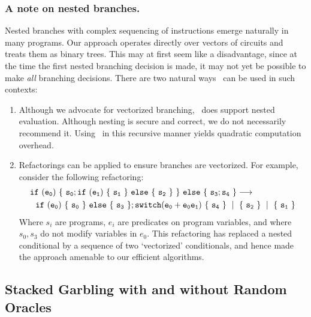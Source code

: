 \subsubsection{A note on nested branches.}
Nested branches with
complex sequencing of instructions emerge
naturally in many programs.
%
Our approach operates directly over vectors of circuits and treats
them as binary trees.
This may at first seem like a disadvantage, since at the
time the first nested branching decision is made, it may not yet be
possible to make \emph{all} branching decisions.
%
There are two natural ways \ourschemelong\ can be used in such
contexts:
%
\begin{enumerate}
  \item Although we advocate for vectorized branching,
    \ourschemelong\ does support nested evaluation.
    Although nesting is secure and correct, we do not necessarily
    recommend it. Using \ourschemelong\ in this recursive manner
    yields quadratic computation overhead.
  \item Refactorings can be applied to ensure branches
    are vectorized. For example, consider the following refactoring:
    \begin{align*}
      &{ \tt if~(e_0)~\{~s_0 ;
      if~(e_1)~\{~s_1~\}~else~\{~s_2~\}~\}~else~\{~s_3 ; s_4~\}
    \longrightarrow}
    \\
      &~~{ \tt if~(e_0)~\{~s_0~\}~else~\{~s_3~\};
        switch (e_0 + e_0e_1)~\{~s_4~\}~\mid~\{~s_2~\}~\mid~\{~s_1~\}
    }
    \end{align*}
    Where $s_i$ are programs, $e_i$ are predicates on program
    variables, and where $s_0, s_3$ do not modify variables in $e_0$.
    This refactoring has replaced a nested conditional by a sequence
    of two `vectorized' conditionals, and hence made the approach
    amenable to our efficient algorithms.
\end{enumerate}
%




\subsection{Stacked Garbling with and without Random Oracles}
\label{sec:techOverviewRO}


